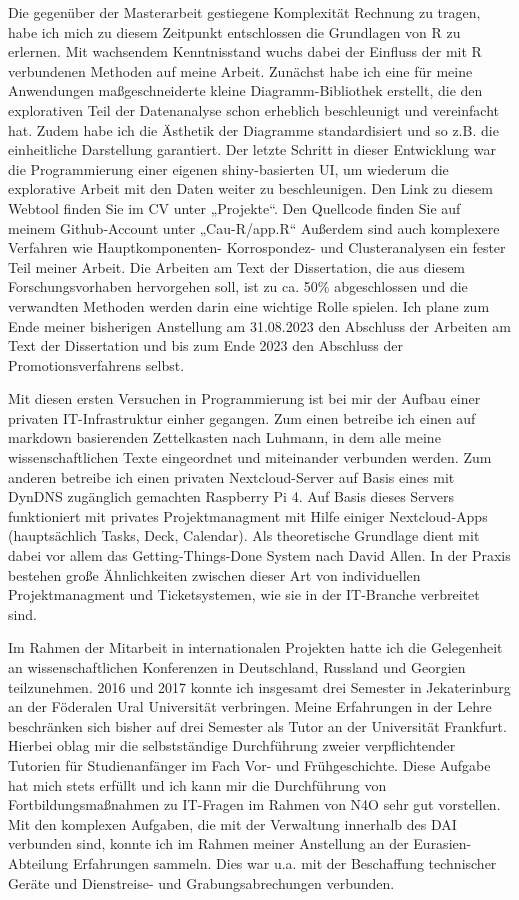 \documentclass[10pt, a4paper]{article}
\begin{document}
Die gegenüber der Masterarbeit gestiegene Komplexität Rechnung zu tragen, habe ich mich zu diesem Zeitpunkt entschlossen die Grundlagen von R zu erlernen. Mit wachsendem Kenntnisstand wuchs dabei der Einfluss der mit R verbundenen Methoden auf meine Arbeit. Zunächst habe ich eine für meine Anwendungen maßgeschneiderte kleine Diagramm-Bibliothek erstellt, die den explorativen Teil der Datenanalyse schon erheblich beschleunigt und vereinfacht hat. Zudem habe ich die Ästhetik der Diagramme standardisiert und so z.B. die einheitliche Darstellung garantiert. Der letzte Schritt in dieser Entwicklung war die Programmierung einer eigenen shiny-basierten UI, um wiederum die explorative Arbeit mit den Daten weiter zu beschleunigen. Den Link zu diesem Webtool finden Sie im CV unter „Projekte“. Den Quellcode finden Sie auf meinem Github-Account unter „Cau-R/app.R“ Außerdem sind auch komplexere Verfahren wie Hauptkomponenten- Korrospondez- und Clusteranalysen ein fester Teil meiner Arbeit. Die Arbeiten am Text der Dissertation, die aus diesem Forschungsvorhaben hervorgehen soll, ist zu ca. 50\% abgeschlossen und die verwandten Methoden werden darin eine wichtige Rolle spielen. Ich plane zum Ende meiner bisherigen Anstellung am 31.08.2023 den Abschluss der Arbeiten am Text der Dissertation und bis zum Ende 2023 den Abschluss der Promotionsverfahrens selbst.

Mit diesen ersten Versuchen in Programmierung ist bei mir der Aufbau einer privaten IT-Infrastruktur einher gegangen. Zum einen betreibe ich einen auf markdown basierenden Zettelkasten nach Luhmann, in dem alle meine wissenschaftlichen Texte eingeordnet und miteinander verbunden werden. Zum anderen betreibe ich einen privaten Nextcloud-Server auf Basis eines mit DynDNS zugänglich gemachten Raspberry Pi 4. Auf Basis dieses Servers funktioniert mit privates Projektmanagment mit Hilfe einiger Nextcloud-Apps (hauptsächlich Tasks, Deck, Calendar). Als theoretische Grundlage dient mit dabei vor allem das Getting-Things-Done System nach David Allen. In der Praxis bestehen große Ähnlichkeiten zwischen dieser Art von individuellen Projektmanagment und Ticketsystemen, wie sie in der IT-Branche verbreitet sind.

Im Rahmen der Mitarbeit in internationalen Projekten hatte ich die Gelegenheit an wissenschaftlichen Konferenzen in Deutschland, Russland und Georgien teilzunehmen. 2016 und 2017 konnte ich insgesamt drei Semester in Jekaterinburg an der Föderalen Ural Universität verbringen. Meine Erfahrungen in der Lehre beschränken sich bisher auf drei Semester als Tutor an der Universität Frankfurt. Hierbei oblag mir die selbstständige Durchführung zweier verpflichtender Tutorien für Studienanfänger im Fach Vor- und Frühgeschichte. Diese Aufgabe hat mich stets erfüllt und ich kann mir die Durchführung von Fortbildungsmaßnahmen zu IT-Fragen im Rahmen von N4O sehr gut vorstellen. Mit den komplexen Aufgaben, die mit der Verwaltung innerhalb des DAI verbunden sind, konnte ich im Rahmen meiner Anstellung an der Eurasien-Abteilung Erfahrungen sammeln. Dies war u.a. mit der Beschaffung technischer Geräte und Dienstreise- und Grabungsabrechungen verbunden.
\end{document}
